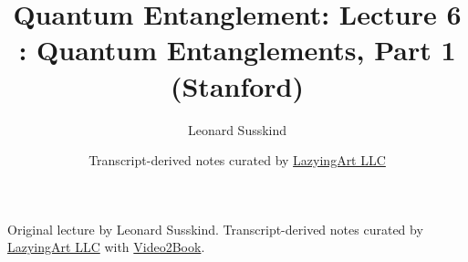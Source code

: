 \documentclass[11pt,oneside]{book}
\begin{document}
\frontmatter
\title{Quantum Entanglement: Lecture 6 : Quantum Entanglements, Part 1 (Stanford)}
\author{Leonard Susskind}
\date{Transcript-derived notes curated by \href{https://lazying.art}{LazyingArt LLC}}
\maketitle
\begin{center}
\small Original lecture by Leonard Susskind. Transcript-derived notes curated by \href{https://lazying.art}{LazyingArt LLC} with \href{https://github.com/lachlanchen/Video2Book}{Video2Book}.
\end{center}
\clearpage
\mainmatter

\end{document}
